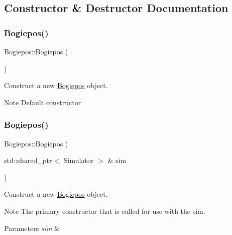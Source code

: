\subsection{Constructor \& Destructor Documentation}
\mbox{\label{classBogiepos_ad5db58b0f0ad66be505851ea9514d579}} 
\subsubsection{\texorpdfstring{Bogiepos()}{Bogiepos()}\hspace{0.1cm}{\footnotesize\ttfamily [1/2]}}
{\footnotesize\ttfamily Bogiepos\+::\+Bogiepos (\begin{DoxyParamCaption}{ }\end{DoxyParamCaption})}



Construct a new \hyperlink{classBogiepos}{Bogiepos} object. 

\begin{DoxyNote}{Note}
Default constructor 
\end{DoxyNote}
\mbox{\label{classBogiepos_a658f927c4ae34b41c7bd08b6a448b9cb}} 
\subsubsection{\texorpdfstring{Bogiepos()}{Bogiepos()}\hspace{0.1cm}{\footnotesize\ttfamily [2/2]}}
{\footnotesize\ttfamily Bogiepos\+::\+Bogiepos (\begin{DoxyParamCaption}\item[{std\+::shared\+\_\+ptr$<$ Simulator $>$ \&}]{sim }\end{DoxyParamCaption})}



Construct a new \hyperlink{classBogiepos}{Bogiepos} object. 

\begin{DoxyNote}{Note}
The primary constructor that is called for use with the sim.
\end{DoxyNote}

\begin{DoxyParams}{Parameters}
{\em sim} & \\
\hline
\end{DoxyParams}


